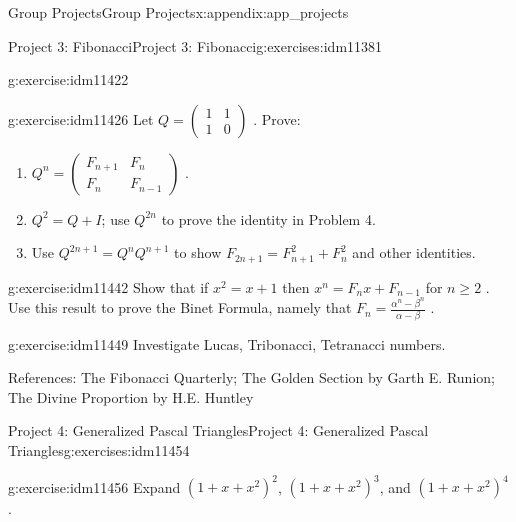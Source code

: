 \documentclass[oneside,10pt,]{book}
\numberwithin{equation}{chapter}
\newcommand{\amp}{&}
\begin{document}
\begin{appendixptx}{Group Projects}{}{Group Projects}{}{}{x:appendix:app_projects}
\begin{exercises-section-numberless}{Project 3: Fibonacci}{}{Project 3: Fibonacci}{}{}{g:exercises:idm11381}
\begin{divisionexercise}{6}{}{}{g:exercise:idm11422}
\begin{equation*}
\end{equation*}
%
\end{divisionexercise}%
\begin{divisionexercise}{7}{}{}{g:exercise:idm11426}%
Let \(Q =\begin{pmatrix}1 \amp 1 \\ 1 \amp 0\end{pmatrix}\) . Prove:%
\begin{enumerate}[label=(\alph*)]
\item{}\(Q^{n} = \begin{pmatrix} F_{n + 1} \amp F_{n}\\ F_{n} \amp F_{n - 1} \end{pmatrix}\) .%
\item{}\(Q^{2} = Q + I\); use \(Q^{2n}\) to prove the identity in Problem 4.%
\item{}Use \(Q^{2n + 1} = Q^{n}Q^{n + 1}\) to show \(F_{2n + 1} = F_{n + 1}^{2} + F_{n}^{2}\) and other identities.%
\end{enumerate}
%
\end{divisionexercise}%
\begin{divisionexercise}{8}{}{}{g:exercise:idm11442}%
Show that if \(x^{2} = x + 1\) then \(x^{n} = F_{n}x + F_{n - 1}\) for \(n \geq 2\) . Use this result to prove the Binet Formula, namely that \(F_{n} = \frac{\alpha^{n} - \beta^{n}}{\alpha - \beta}\) .%
\end{divisionexercise}%
\begin{divisionexercise}{9}{}{}{g:exercise:idm11449}%
Investigate Lucas, Tribonacci, Tetranacci numbers.%
\end{divisionexercise}%
\begin{conclusion}{}%
References: The Fibonacci Quarterly; The Golden Section by Garth E. Runion; The Divine Proportion by H.E. Huntley%
\end{conclusion}%
\end{exercises-section-numberless}
%
%
\typeout{************************************************}
\typeout{************************************************}
%
\begin{exercises-section-numberless}{Project 4: Generalized Pascal Triangles}{}{Project 4: Generalized Pascal Triangles}{}{}{g:exercises:idm11454}
\begin{divisionexercise}{1}{}{}{g:exercise:idm11456}%
Expand \({\left( 1 + x + x^{2} \right)}^{2}\), \(\left( 1 + x + x^{2} \right)^{3}\), and \(\left( 1 + x + x^{2} \right)^{4}\).%

\end{divisionexercise}
\end{exercises-section-numberless}
\end{appendixptx}
\end{document}
